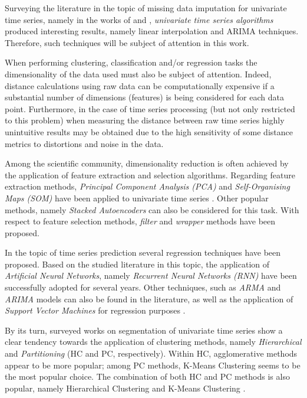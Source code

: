 \documentclass[11pt]{article}
\begin{document}
Surveying the literature in the topic of missing data imputation for univariate time series, namely in the works of \cite{abreu2012using} and \cite{moritz2015comparison}, \emph{univariate time series algorithms} produced interesting results, namely linear interpolation and ARIMA techniques. Therefore, such techniques will be subject of attention in this work.

When performing clustering, classification and/or regression tasks the dimensionality of the data used must also be subject of attention. Indeed, distance calculations using raw data can be computationally expensive if a substantial number of dimensions (features) is being considered for each data point. Furthermore, in the case of time series processing (but not only restricted to this problem) when measuring the distance between raw time series highly unintuitive results may be obtained due to the high sensitivity of some distance metrics to distortions and noise in the data.

Among the scientific community, dimensionality reduction is often achieved by the application of feature extraction and selection algorithms. Regarding feature extraction methods, \emph{Principal Component Analysis (PCA)} and \emph{Self-Organising Maps (SOM)} have been applied to univariate time series \cite{calabrese2010eigenplaces, abreu2012using, aghabozorgi2015time}. Other popular methods, namely \emph{Stacked Autoencoders} \cite{vincent2010stacked} can also be considered for this task. With respect to feature selection methods, \emph{filter} and \emph{wrapper} methods have been proposed.

In the topic of time series prediction several regression techniques have been proposed. Based on the studied literature in this topic, the application of \emph{Artificial Neural Networks}, namely \emph{Recurrent Neural Networks (RNN)} \cite{connor1994recurrent, elsaid2016using} have been successfully adopted for several years. Other techniques, such as \emph{ARMA} and \emph{ARIMA}\cite{zhang2003time} models can also be found in the literature, as well as the application of \emph{Support Vector Machines} for regression purposes \cite{tay2002modified, kim2003financial}.

By its turn, surveyed works on segmentation of univariate time series show a clear tendency towards the application of clustering methods, namely \emph{Hierarchical} and \emph{Partitioning} (HC and PC, respectively). Within HC, agglomerative methods appear to be more popular; among PC  methods, K-Means Clustering seems to be the most popular choice. The combination of both HC and PC methods is also popular, namely Hierarchical Clustering and K-Means Clustering \cite{abreu2012using}.
\end{document}
